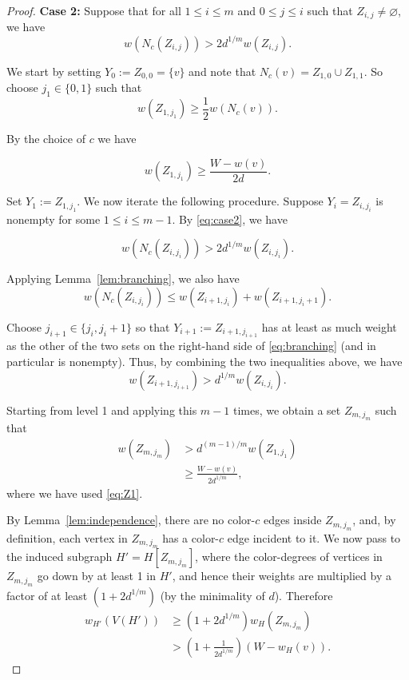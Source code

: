 \documentclass[11pt]{article}
\theoremstyle{plain}
\theoremstyle{definition}
\theoremstyle{definition}
\theoremstyle{remark}
\begin{document}
\begin{proof}
\textbf{Case 2:} Suppose that for all \( 1\leq i\leq m\) and \(0\leq j \leq i\) such that \(Z_{i,j}\neq\varnothing\), we have
\begin{equation} \label{eq:case2}
 w(N_{c}(Z_{i,j})) > 2 d^{1/m} w(Z_{i,j}).
\end{equation}

We start by setting \(Y_{0}:=Z_{0,0}=\{v\}\) and note that
\(N_{c}(v)=Z_{1,0} \cup Z_{1,1}\). So choose \(j_{1}\in \{ 0,1 \}\)
such that \[
 w(Z_{1,j_{1} })\geq \frac{1}{2} w(N_{c}(v)). \]

By the choice of \(c\) we have

\begin{equation}
 w(Z_{1,j_1})\geq \frac{W-w(v)}{2d}.
\label{eq:Z1}
\end{equation}

Set $Y_1 := Z_{1,j_1}$. We now iterate the following procedure. Suppose \(Y_i=Z_{i,j_i}\) is
nonempty for some \(1\leq i\leq m-1\). By \eqref{eq:case2}, we have

\begin{equation*}
w(N_c(Z_{i,j_i})) > 2 d^{1/m}w(Z_{i,j_i}).
\end{equation*}

Applying Lemma~\ref{lem:branching}, we also have
\begin{equation}\label{eq:branching}
    w(N_{c}(Z_{i,j_{i}})) \leq w(Z_{i+1,j_{i}})+w(Z_{i+1,j_{i}+1}).
\end{equation}

Choose \(j_{i+1}\in\{j_i,j_i+1\}\) so that
\(Y_{i+1}:=Z_{i+1,j_{i+1}}\) has at least as much weight as the other of the two
sets on the right-hand side of \eqref{eq:branching} (and in particular is nonempty). Thus, by combining
the two inequalities above, we have 
\[
 w(Z_{i+1,j_{i+1}}) > d^{1/m} w(Z_{i,j_{i}}).
 \]

Starting from level 1 and applying this \(m-1\) times, we obtain a set
\(Z_{m,j_{m}}\) such that
\begin{align*} 
w(Z_{m,j_{m}})  & >  d^{(m-1)/m}w(Z_{1,j_{1}})  \\
 & \geq \frac{W-w(v)}{2d^{1/m}},
\end{align*}
where we have used \eqref{eq:Z1}.

By Lemma~\ref{lem:independence}, there are no color-\(c\) edges inside
\(Z_{m,j_m}\), and, by definition, each vertex in \(Z_{m,j_m}\) has a color-\(c\) edge incident to it. We now pass to the induced subgraph \(H'=H[Z_{m,j_m}]\), where the color-degrees of vertices in \(Z_{m,j_m}\)
go down by at least 1 in $H'$, and hence their weights are multiplied by a factor of at least $(1+2d^{1/m})$ (by the minimality of $d$). Therefore
\begin{align*}
  w_{H'}(V(H'))  & \geq (1+2d^{1/m}) w_{H}(Z_{m,j_m})  \\
   & > \left(1 + \frac{1}{2 d^{1/m}}\right) (W-w_{H}(v)).
 \end{align*} 


\end{proof}
\end{document}
